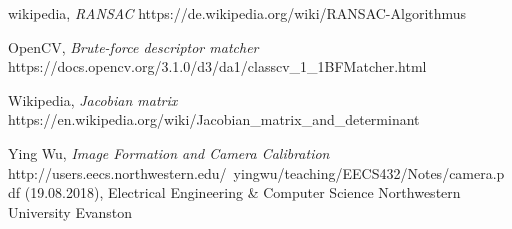 \documentclass[11pt,a4paper,titlepage,oneside]{report}
\begin{document}
\begin{thebibliography}{1}
	wikipedia,
	\textit{RANSAC}
	https://de.wikipedia.org/wiki/RANSAC-Algorithmus

	OpenCV,
	\textit{Brute-force descriptor matcher}
	https://docs.opencv.org/3.1.0/d3/da1/classcv\_1\_1BFMatcher.html

	Wikipedia,
	\textit{Jacobian matrix}
	https://en.wikipedia.org/wiki/Jacobian\_matrix\_and\_determinant

	Ying Wu,
	\textit{Image Formation and Camera Calibration}
	http://users.eecs.northwestern.edu/~yingwu/teaching/EECS432/Notes/camera.pdf (19.08.2018), Electrical Engineering \& Computer Science Northwestern University Evanston

\end{thebibliography}
\end{document}
